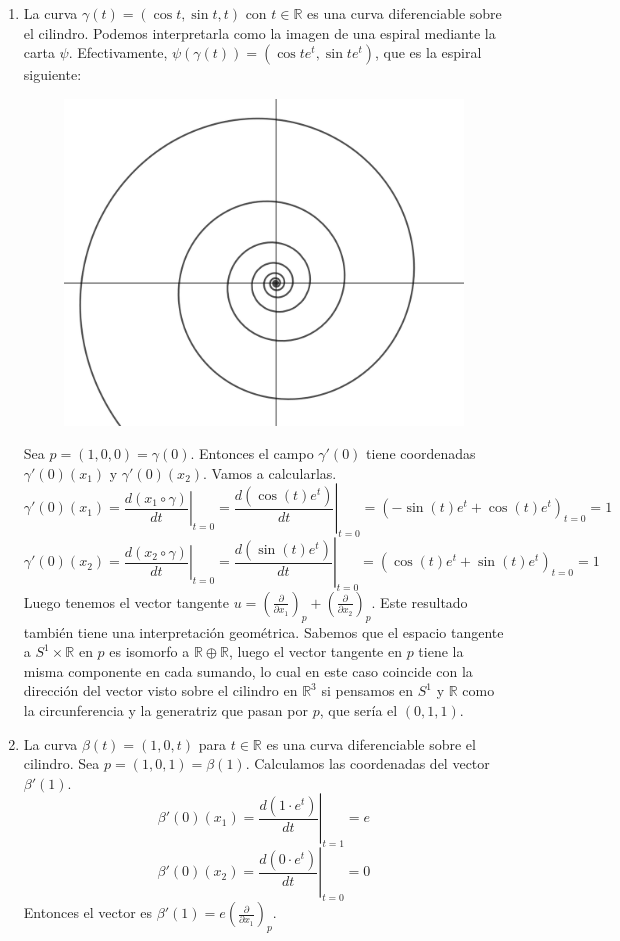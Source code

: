 \documentclass[twoside, 11pt]{article}
\theoremstyle{definition}
\newcommand{\R}{\mathbb{R}}
\newcommand{\parcial}[2]{\frac{\partial #1}{\partial #2}}
\begin{document}
\begin{enumerate}
\item La curva $\gamma(t)=(\cos t, \sin t, t)$ con $t\in\R$ es una curva diferenciable sobre el cilindro. Podemos interpretarla como la imagen de una espiral mediante la carta $\psi$. Efectivamente, $\psi(\gamma(t))=(\cos t e^t, \sin t e^t)$, que es la espiral siguiente:
\begin{figure}[h!]
\includegraphics[scale=0.3]{espiral}
\end{figure}


\newpage
Sea $p=(1,0,0) =\gamma(0)$. Entonces el campo $\gamma'(0)$ tiene coordenadas $\gamma'(0)(x_1)$ y $\gamma'(0)(x_2)$. Vamos a calcularlas. 
\[
\gamma'(0)(x_1)=\left.\frac{d(x_1\circ\gamma)}{dt}\right|_{t=0}=\left.\frac{d(\cos(t)e^t)}{dt}\right|_{t=0}=(-\sin(t)e^t+\cos(t)e^t)_{t=0}=1
\]
\[
\gamma'(0)(x_2)=\left.\frac{d(x_2\circ\gamma)}{dt}\right|_{t=0}=\left.\frac{d(\sin(t)e^t)}{dt}\right|_{t=0}=(\cos(t)e^t+\sin(t)e^t)_{t=0}=1
\]
Luego tenemos el vector tangente $u=\left(\parcial{}{x_1}\right)_p+\left(\parcial{}{x_2}\right)_p$. Este resultado también tiene una interpretación geométrica. Sabemos que el espacio tangente a $S^1\times\R$ en $p$ es isomorfo a $\R\oplus\R$, luego el vector tangente en $p$ tiene la misma componente en cada sumando, lo cual en este caso coincide con la dirección del vector visto sobre el cilindro en $\R^3$ si pensamos en $S^1$ y $\R$ como la circunferencia y la generatriz que pasan por $p$, que sería el $(0,1,1)$. 

\item  La curva $\beta(t)=(1, 0, t)$ para $t\in\R$ es una curva diferenciable sobre el cilindro. Sea $p=(1,0,1)=\beta(1)$. Calculamos las coordenadas del vector $\beta'(1)$.
\[
\beta'(0)(x_1)=\left.\frac{d(1\cdot e^t)}{dt}\right|_{t=1}=e
\]
\[
\beta'(0)(x_2)=\left.\frac{d(0\cdot e^t)}{dt}\right|_{t=0}=0
\]
Entonces el vector es $\beta'(1)=e\left(\parcial{}{x_1}\right)_p$. 


\end{enumerate}
\end{document}
